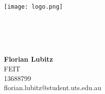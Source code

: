 \begin{titlepage}

\begin{center}
\texttt{[image: logo.png]}\\[5ex]


\large{\betreff}\\[3.5ex]

\LARGE{\textbf{\titel}}\\[1.5ex]
\large{\untertitel}\\[3.5ex]

\normalsize

\begin{tabular}{c}

\end{tabular}

\textbf{\Large{Florian Lubitz}}\\
FEIT\\
13688799\\
florian.lubitz@student.uts.edu.au
\\[3ex]

\end{center}

\end{titlepage}